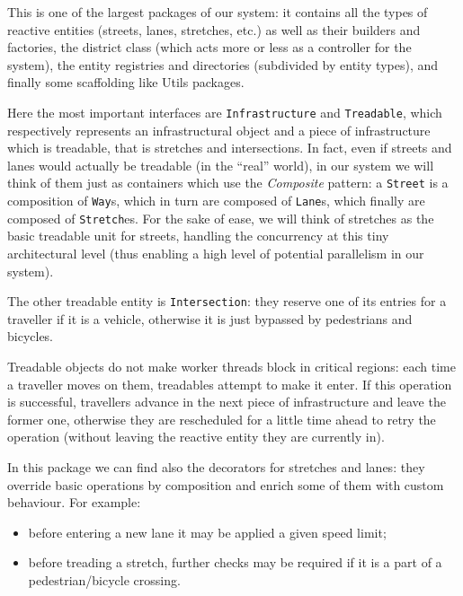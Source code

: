 This is one of the largest packages of our system: it contains all the types of
reactive entities (streets, lanes, stretches, etc.) as well as their builders
and factories, the district class (which acts more or less as a controller for
the system), the entity registries and directories (subdivided by entity types),
and finally some scaffolding like Utils packages.

Here the most important interfaces are \texttt{Infrastructure} and
\texttt{Treadable}, which respectively represents an infrastructural object and
a piece of infrastructure which is treadable, that is stretches and
intersections.
In fact, even if streets and lanes would actually be treadable (in the ``real''
world), in our system we will think of them just as containers which use the
\textit{Composite} pattern: a \texttt{Street} is a composition of \texttt{Way}s,
which in turn are composed of \texttt{Lane}s, which finally are composed of
\texttt{Stretch}es.
For the sake of ease, we will think of stretches as the basic treadable unit
for streets, handling the concurrency at this tiny architectural level (thus
enabling a high level of potential parallelism in our system).

The other treadable entity is \texttt{Intersection}: they reserve one of its
entries for a traveller if it is a vehicle, otherwise it is just bypassed by
pedestrians and bicycles.

Treadable objects do not make worker threads block in critical regions: each
time a traveller moves on them, treadables attempt to make it enter. If this
operation is successful, travellers advance in the next piece of infrastructure
and leave the former one, otherwise they are rescheduled for a little time ahead
to retry the operation (without leaving the reactive entity they are currently
in).

In this package we can find also the decorators for stretches and lanes: they
override basic operations by composition and enrich some of them with custom
behaviour. For example:

\begin{itemize}
  \item before entering a new lane it may be applied a given speed limit;
  \item before treading a stretch, further checks may be required if it is a
    part of a pedestrian/bicycle crossing.
 \end{itemize}
